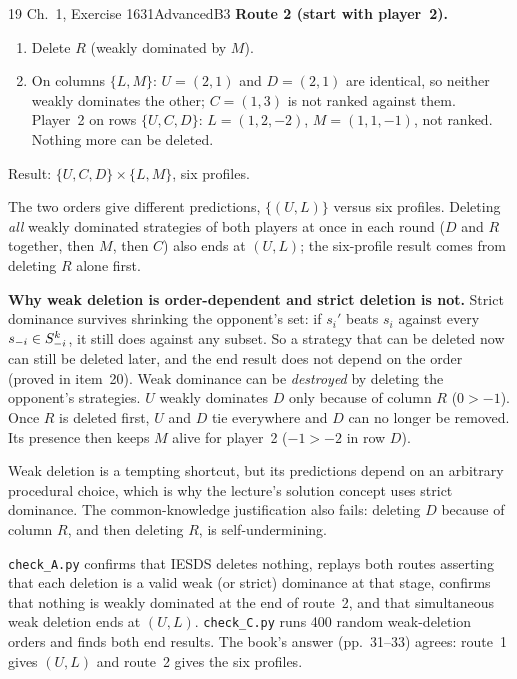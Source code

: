 \begin{exsol}{19}{\MG{} Ch.~1, Exercise 16}{31}{Advanced}{B3}
\textbf{Route 2 (start with player~2).}
\begin{enumerate}
  \item Delete $R$ (weakly dominated by $M$).
  \item On columns $\{L, M\}$: $U = (2, 1)$ and $D = (2, 1)$ are identical, so neither weakly
  dominates the other; $C = (1, 3)$ is not ranked against them. Player~2 on rows
  $\{U, C, D\}$: $L = (1, 2, -2)$, $M = (1, 1, -1)$, not ranked. Nothing more can be deleted.
\end{enumerate}
Result: $\{U, C, D\} \times \{L, M\}$, six profiles.

The two orders give different predictions, $\{(U,L)\}$ versus six profiles. Deleting \emph{all}
weakly dominated strategies of both players at once in each round ($D$ and $R$ together, then
$M$, then $C$) also ends at $(U, L)$; the six-profile result comes from deleting $R$ alone first.

\textbf{Why weak deletion is order-dependent and strict deletion is not.} Strict dominance
survives shrinking the opponent's set: if $s_i'$ beats $s_i$ against every $s_{-i} \in S_{-i}^k$, it
still does against any subset. So a strategy that can be deleted now can still be deleted later,
and the end result does not depend on the order (proved in item~20). Weak dominance can be
\emph{destroyed} by deleting the opponent's strategies. $U$ weakly dominates $D$ only because of
column $R$ ($0 > -1$). Once $R$ is deleted first, $U$ and $D$ tie everywhere and $D$ can no longer
be removed. Its presence then keeps $M$ alive for player~2 ($-1 > -2$ in row $D$).

\interp Weak deletion is a tempting shortcut, but its predictions depend on an arbitrary
procedural choice, which is why the lecture's solution concept uses strict dominance. The
common-knowledge justification also fails: deleting $D$ because of column $R$, and then deleting
$R$, is self-undermining.

\verify \texttt{check\_A.py} confirms that IESDS deletes nothing, replays both routes asserting
that each deletion is a valid weak (or strict) dominance at that stage, confirms that nothing
is weakly dominated at the end of route~2, and that simultaneous weak deletion ends at $(U,L)$.
\texttt{check\_C.py} runs 400 random weak-deletion orders and finds both end results. The
book's answer (pp.~31--33) agrees: route~1 gives $(U, L)$ and route~2 gives the six profiles.

\end{exsol}
